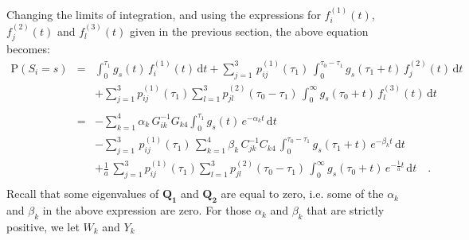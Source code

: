 \documentclass[11pt]{article}
\begin{document}
Changing the limits of integration, and using the expressions for $f^{(1)}_{i}(t)$, $f^{(2)}_{j}(t)$ and $f^{(3)}_{l}(t)$ given in the previous section, the above equation 
becomes: 
\begin{eqnarray*}
\mathrm{P}\left(S_{i}=s\right)&=&\displaystyle\int_{0}^{\tau_{1}} \! g_{s}(t) \, f^{(1)}_{i}(t) \, \mathrm{d}t + \displaystyle \sum_{j=1}^{3}\,p^{(1)}_{ij}(\tau_{1})\,\int_{0}^{\tau_{0}-\tau_{1}} \!g_{s}(\tau_{1}+t)\,f_{j}^{(2)}\left(t\right)\,\mathrm{d}t\\
&& +\displaystyle\sum_{j=1}^{3} p^{(1)}_{ij}(\tau_{1})\displaystyle\sum_{l=1}^{3}p^{(2)}_{jl}(\tau_{0}-\tau_{1})\,\int_{0}^{\infty} \!g_{s}(\tau_{0}+t)\,f^{(3)}_{l}(t) \,\mathrm{d}t 
\\
\\
&=&-\displaystyle \sum_{k=1}^{4}\alpha_{k}\,G^{-1}_{ik}G_{k4}\displaystyle\int_{0}^{\tau_{1}} \! g_{s}(t) \, e^{-\alpha_{k}t} \, \mathrm{d}t \\
&&- \displaystyle \sum_{j=1}^{3}\,p^{(1)}_{ij}(\tau_{1})\,\sum_{k=1}^{4} \beta_{k}\, C_{jk}^{-1}C_{k4}\,\displaystyle \int_{0}^{\tau_{0}-\tau_{1}} \!g_{s}(\tau_{1}+t)\,e^{-\beta_{k}t}\, \mathrm{d}t\\
&& + \displaystyle \frac{1}{a} \, \displaystyle \sum_{j=1}^{3} p^{(1)}_{ij}(\tau_{1})\displaystyle\sum_{l=1}^{3}p^{(2)}_{jl}(\tau_{0}-\tau_{1})\,\int_{0}^{\infty} \!g_{s}(\tau_{0}+t)\, e^{-\frac{1}{a}t} \, \mathrm{d}t \quad.\\
\end{eqnarray*}
Recall 
that some eigenvalues of $\mathbf{Q_{1}}$ and $\mathbf{Q_{2}}$  
are equal to zero, i.e. some of the $\alpha_{k}$ and $\beta_{k}$ 
in the above expression are zero.  For those $\alpha_{k}$ and $\beta_{k}$ that are strictly positive, we let $W_{k}$ and $Y_{k}$ 
\end{document}
